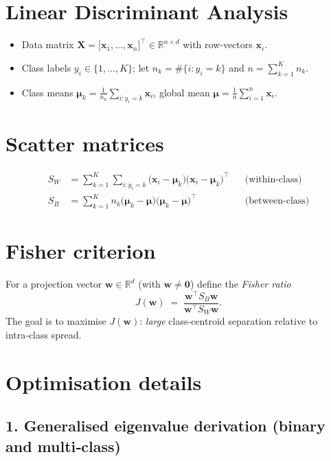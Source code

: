 \section{Linear Discriminant Analysis}

\begin{itemize}
  \item Data matrix $\mathbf X=\bigl[\mathbf x_1,\dots,\mathbf x_n\bigr]^\top\in\mathbb R^{n\times d}$ with row‑vectors $\mathbf x_i$.
  \item Class labels $y_i\in\{1,\dots,K\}$; let $n_k=\#\{i:y_i=k\}$ and $n=\sum_{k=1}^K n_k$.
  \item Class means $\displaystyle \boldsymbol\mu_k=\frac1{n_k}\sum_{i:y_i=k}\mathbf x_i$,  
        global mean $\displaystyle \boldsymbol\mu=\frac1n\sum_{i=1}^n\mathbf x_i$.
\end{itemize}

\section{Scatter matrices}

\begin{align*}
S_W &=\sum_{k=1}^{K}\sum_{i:y_i=k}\bigl(\mathbf x_i-\boldsymbol\mu_k\bigr)
                            \bigl(\mathbf x_i-\boldsymbol\mu_k\bigr)^{\!\top}
      &&\text{(within‑class)}\\[4pt]
S_B &=\sum_{k=1}^{K}n_k\bigl(\boldsymbol\mu_k-\boldsymbol\mu\bigr)
                       \bigl(\boldsymbol\mu_k-\boldsymbol\mu\bigr)^{\!\top}
      &&\text{(between‑class)}
\end{align*}

\section{Fisher criterion}

For a projection vector $\mathbf w\in\mathbb R^{d}$ (with $\mathbf w\neq\mathbf 0$) define the
\emph{Fisher ratio}
\[
J(\mathbf w)\;=\;
\frac{\mathbf w^{\top}S_B\mathbf w}{\mathbf w^{\top}S_W\mathbf w}.
\]
The goal is to maximise $J(\mathbf w)$: \emph{large} class‑centroid separation relative to
intra‑class spread.

\section{Optimisation details}

\subsection*{1.\; Generalised eigenvalue derivation (binary and multi‐class)}

